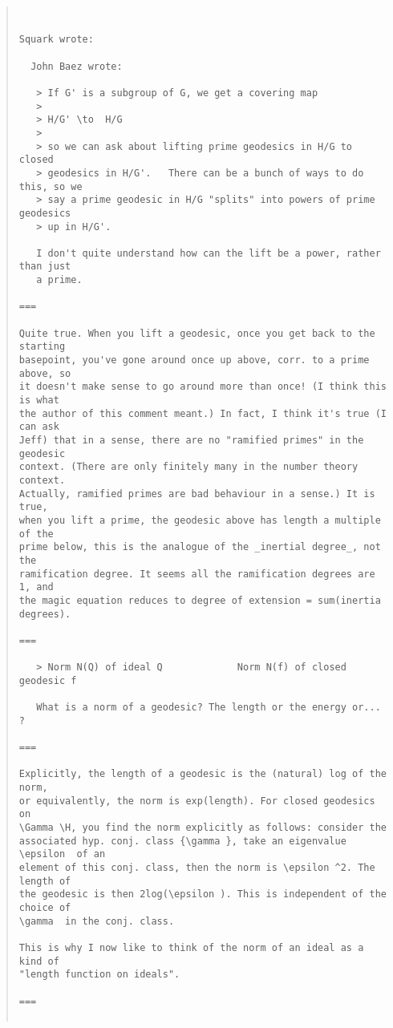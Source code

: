 \begin{quote}

\begin{verbatim}


Squark wrote:

  John Baez wrote:

   > If G' is a subgroup of G, we get a covering map
   >
   > H/G' \to  H/G
   >
   > so we can ask about lifting prime geodesics in H/G to closed
   > geodesics in H/G'.   There can be a bunch of ways to do this, so we 
   > say a prime geodesic in H/G "splits" into powers of prime geodesics 
   > up in H/G'.

   I don't quite understand how can the lift be a power, rather than just
   a prime.

===

Quite true. When you lift a geodesic, once you get back to the starting
basepoint, you've gone around once up above, corr. to a prime above, so
it doesn't make sense to go around more than once! (I think this is what
the author of this comment meant.) In fact, I think it's true (I can ask
Jeff) that in a sense, there are no "ramified primes" in the geodesic
context. (There are only finitely many in the number theory context.
Actually, ramified primes are bad behaviour in a sense.) It is true,
when you lift a prime, the geodesic above has length a multiple of the
prime below, this is the analogue of the _inertial degree_, not the
ramification degree. It seems all the ramification degrees are 1, and
the magic equation reduces to degree of extension = sum(inertia
degrees).

===

   > Norm N(Q) of ideal Q             Norm N(f) of closed geodesic f

   What is a norm of a geodesic? The length or the energy or... ?

===

Explicitly, the length of a geodesic is the (natural) log of the norm,
or equivalently, the norm is exp(length). For closed geodesics on
\Gamma \H, you find the norm explicitly as follows: consider the
associated hyp. conj. class {\gamma }, take an eigenvalue \epsilon  of an
element of this conj. class, then the norm is \epsilon ^2. The length of
the geodesic is then 2log(\epsilon ). This is independent of the choice of
\gamma  in the conj. class.

This is why I now like to think of the norm of an ideal as a kind of
"length function on ideals".

===


\end{verbatim}
\end{quote}

